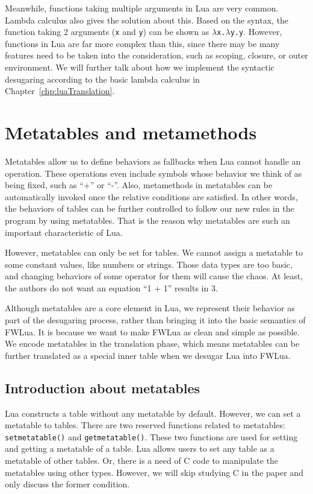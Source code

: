 Meanwhile, functions taking multiple arguments in Lua are very common. Lambda calculus also gives the solution about this. Based on the syntax, the function taking 2 arguments ({\tt x} and {\tt y}) can be shown as {\tt $\lambda$x.$\lambda$y.y}. However, functions in Lua are far more complex than this, since there may be many features need to be taken into the consideration, such as scoping, closure, or outer environment. We will further talk about how we implement the syntactic desugaring according to the basic lambda calculus in Chapter~\ref{chp:luaTranslation}.


\section{Metatables and metamethods}
Metatables allow us to define behaviors as fallbacks when Lua cannot handle an operation. These operations even include symbols whose behavior we think of as being fixed, such as ``+'' or ``-''.
Also, metamethods in metatables can be automatically invoked once the relative conditions are satisfied. In other words, the behaviors of tables can be further controlled to follow our new rules in the program by using metatables. That is the reason why metatables are such an important characteristic of Lua.

However, metatables can only be set for tables. We cannot assign a metatable to some constant values, like numbers or strings. Those data types are too basic, and changing behaviors of some operator for them will cause the chaos. At least, the authors do not want an equation ``1 + 1'' results in 3. 

Although metatables are a core element in Lua, we represent their behavior as part of the desugaring process, rather than bringing it into the basic semantics of FWLua.
It is because we want to make FWLua as clean and simple as possible.
We encode metatables in the translation phase, which means metatables can be further translated as a special inner table when we desugar Lua into FWLua.

\subsection{Introduction about metatables}
Lua constructs a table without any metatable by default.
However, we can set a metatable to tables.
There are two reserved functions related to metatables: {\tt setmetatable()} and {\tt getmetatable()}. These two functions are used for setting and getting a metatable of a table. 
Lua allows users to set any table as a metatable of other tables. Or, there is a need of C code to manipulate the metatables using other types. However, we will skip studying C in the paper and only discuss the former condition.

